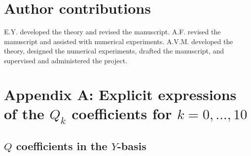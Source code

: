 \documentclass[9pt,twocolumn,twoside]{gsajnl}
\begin{document}
\section*{Author contributions}
E.Y. developed the theory and revised the manuscript.
A.F. revised the manuscript and assisted with numerical experiments.
A.V.M. developed the theory, designed the numerical experiments, drafted the manuscript, and supervised and administered the project.



\appendix



\section{Appendix A: Explicit expressions of the $Q_k$ coefficients for $k = 0, \dots, 10$}
\label{app:explicitQ}

\subsection{$Q$ coefficients in the $Y$-basis}
\end{document}

